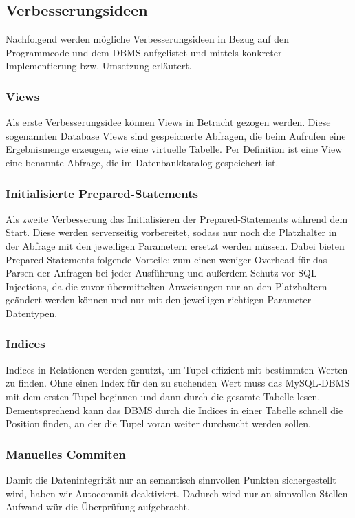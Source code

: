 \subsection{Verbesserungsideen}\label{subsec:verbesserungsideen}
Nachfolgend werden mögliche Verbesserungsideen in Bezug auf den Programmcode und dem DBMS aufgelistet und mittels konkreter Implementierung bzw. Umsetzung erläutert.
\subsubsection{Views}
Als erste Verbesserungsidee können Views in Betracht gezogen werden.
Diese sogenannten Database Views sind gespeicherte Abfragen, die beim Aufrufen eine Ergebnismenge erzeugen, wie eine virtuelle Tabelle.
Per Definition ist eine View eine benannte Abfrage, die im Datenbankkatalog gespeichert ist.

\subsubsection{Initialisierte Prepared-Statements}
Als zweite Verbesserung das Initialisieren der Prepared-Statements während dem Start.
Diese werden serverseitig vorbereitet, sodass nur noch die Platzhalter in der Abfrage mit den jeweiligen Parametern ersetzt werden müssen.
Dabei bieten Prepared-Statements folgende Vorteile: zum einen weniger Overhead für das Parsen der Anfragen bei jeder Ausführung und außerdem Schutz vor SQL-Injections, da die zuvor übermittelten Anweisungen nur an den Platzhaltern geändert werden können und nur mit den jeweiligen richtigen Parameter-Datentypen.
\subsubsection{Indices}
Indices in Relationen werden genutzt, um Tupel effizient mit bestimmten Werten zu finden.
Ohne einen Index für den zu suchenden Wert muss das MySQL-DBMS mit dem ersten Tupel beginnen und dann durch die gesamte Tabelle lesen.
Dementsprechend kann das DBMS durch die Indices in einer Tabelle schnell die Position finden, an der die Tupel voran weiter durchsucht werden sollen.

\subsubsection{Manuelles Commiten}
    Damit die Datenintegrität nur an semantisch sinnvollen Punkten sichergestellt wird, haben wir Autocommit deaktiviert.
    Dadurch wird nur an sinnvollen Stellen Aufwand wür die Überprüfung aufgebracht.

